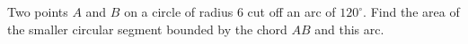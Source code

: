 Two points $A$ and $B$ on a circle of radius $6$ cut off an arc of $120^\circ$. Find the area of the smaller circular segment bounded by the chord $AB$ and this arc.
